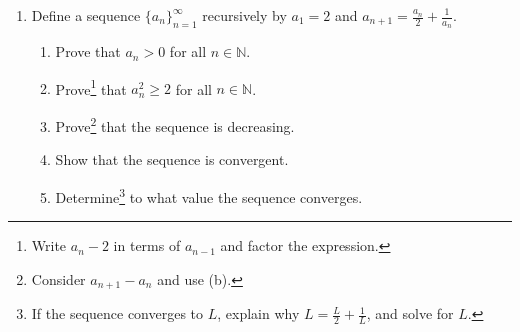 \documentclass[12pt]{amsart}
\newcommand{\N}{\mathbb{N}}
\begin{document}
\begin{enumerate}
\

\

\item Define a sequence $\{a_n\}_{n=1}^\infty$ recursively by $a_1=2$ and $\displaystyle a_{n+1} = \frac{a_{n}}{2} + \frac{1}{a_{n}}$.
\begin{enumerate}
\item Prove that $a_n>0$ for all $n\in \N$.
\item Prove\footnote{Write $a_{n}-2$ in terms of $a_{n-1}$ and factor the expression.} that $a_n^2 \geq 2$ for all $n\in \N$.
\item Prove\footnote{Consider $a_{n+1}-a_n$ and use (b).} that the sequence is decreasing.
\item Show that the sequence is convergent.
\item Determine\footnote{If the sequence converges to $L$, explain why $L = \frac{L}{2} + \frac{1}{L}$, and solve for $L$.} to what value the sequence converges.
\end{enumerate}





\end{enumerate}
\end{document}
